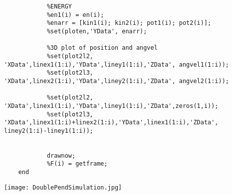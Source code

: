 \documentclass[11]{article}
\begin{document}
\begin{verbatim}
            %ENERGY
            %en1(i) = en(i);
            %enarr = [kin1(i); kin2(i); pot1(i); pot2(i)];
            %set(ploten,'YData', enarr);
            
            %3D plot of position and angvel
            %set(plot2l2, 'XData',linex1(1:i),'YData',liney1(1:i),'ZData', angvel1(1:i));
            %set(plot2l3, 'XData',linex2(1:i),'YData',liney2(1:i),'ZData', angvel2(1:i));

            %set(plot2l2, 'XData',linex1(1:i),'YData',liney1(1:i),'ZData',zeros(1,i));
            %set(plot2l3, 'XData',linex1(1:i)+linex2(1:i),'YData',linex1(1:i),'ZData', liney2(1:i)-liney1(1:i));
      
      
            drawnow;
            %F(i) = getframe;
    end
\end{verbatim}

\begin{center}
\texttt{[image: DoublePendSimulation.jpg]}
\end{center}
\end{document}
